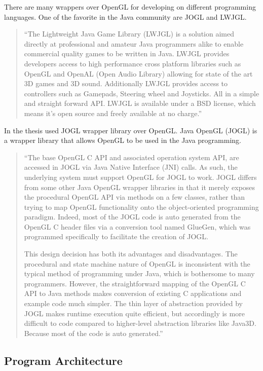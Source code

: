 There are many wrappers over OpenGL for developing on different programming languages.
One of the favorite in the Java community are JOGL and LWJGL.

\begin{quotation}
``The Lightweight Java Game Library (LWJGL) is a solution aimed directly at professional and amateur Java programmers
alike to enable commercial quality games to be written in Java. LWJGL provides developers access to
high performance cross platform libraries such as OpenGL and OpenAL (Open Audio Library) allowing for state of the art
3D games and 3D sound. Additionally LWJGL provides access to controllers such as Gamepads, Steering wheel and Joysticks.
All in a simple and straight forward API.
LWJGL is available under a BSD license, which means it's open source and freely available at no charge.''~\cite{LWJGL}
\end{quotation}


In the thesis used JOGL wrapper library over OpenGL. Java OpenGL (JOGL) is a wrapper library that allows OpenGL to be used in the Java programming.

\begin{quotation}
``The base OpenGL C API and associated operation system API, are accessed in JOGL via Java Native Interface (JNI) calls.
As such, the underlying system must support OpenGL for JOGL to work.
JOGL differs from some other Java OpenGL wrapper libraries in that it merely exposes the procedural OpenGL API
via methods on a few classes, rather than trying to map OpenGL functionality onto the object-oriented programming paradigm.
Indeed, most of the JOGL code is auto generated from the OpenGL C header files via a conversion tool named GlueGen,
which was programmed specifically to facilitate the creation of JOGL.

This design decision has both its advantages and disadvantages.
The procedural and state machine nature of OpenGL is inconsistent with the typical method of programming under Java,
which is bothersome to many programmers. However, the straightforward mapping of the OpenGL C API to Java methods
makes conversion of existing C applications and example code much simpler.
The thin layer of abstraction provided by JOGL makes runtime execution quite efficient,
but accordingly is more difficult to code compared to higher-level abstraction libraries like Java3D.
Because most of the code is auto generated.''~\cite{JOGL}
\end{quotation}


\subsection{Program Architecture}


